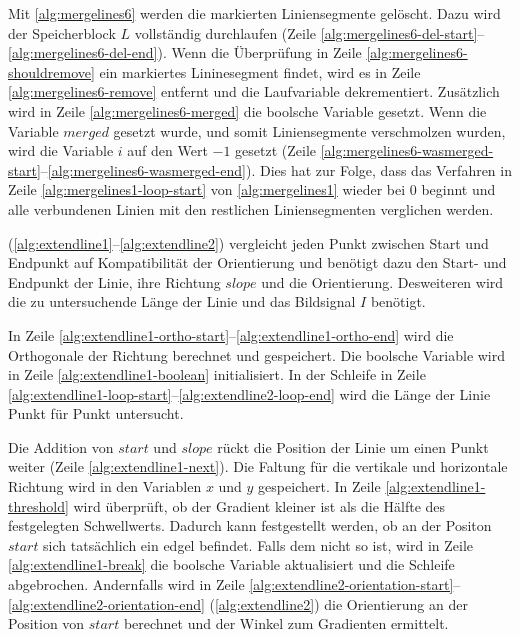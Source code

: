 Mit \autoref{alg:mergelines6} werden die markierten Liniensegmente gelöscht. Dazu wird der Speicherblock $L$
 vollständig durchlaufen (Zeile \ref{alg:mergelines6-del-start}--\ref{alg:mergelines6-del-end}). Wenn die Überprüfung
 in Zeile \ref{alg:mergelines6-shouldremove} ein markiertes Lininesegment findet, wird es in Zeile
 \ref{alg:mergelines6-remove} entfernt und die Laufvariable dekrementiert. Zusätzlich wird in Zeile
 \ref{alg:mergelines6-merged} die boolsche Variable gesetzt. Wenn die Variable $\mathit{merged}$ gesetzt wurde, und
 somit Liniensegmente verschmolzen wurden, wird die Variable $i$ auf den Wert $-1$ gesetzt
 (Zeile \ref{alg:mergelines6-wasmerged-start}--\ref{alg:mergelines6-wasmerged-end}). Dies hat zur Folge, dass das
 Verfahren  in Zeile \ref{alg:mergelines1-loop-start} von \autoref{alg:mergelines1} wieder bei $0$
 beginnt und alle verbundenen Linien mit den restlichen Liniensegmenten verglichen werden.



 (\autoref{alg:extendline1}--\autoref{alg:extendline2}) vergleicht jeden Punkt zwischen Start und
 Endpunkt auf Kompatibilität der Orientierung und benötigt dazu den Start- und Endpunkt der Linie, ihre Richtung
 $\mathit{slope}$ und die Orientierung. Desweiteren wird die zu untersuchende Länge der Linie und das Bildsignal $I$
 benötigt.



In Zeile \ref{alg:extendline1-ortho-start}--\ref{alg:extendline1-ortho-end} wird die Orthogonale der Richtung berechnet
 und gespeichert. Die boolsche Variable wird in Zeile \ref{alg:extendline1-boolean} initialisiert. In der Schleife in
 Zeile \ref{alg:extendline1-loop-start}--\ref{alg:extendline2-loop-end} wird die Länge der Linie Punkt für Punkt
 untersucht.

Die Addition von $\mathit{start}$ und $\mathit{slope}$ rückt die Position der Linie um einen Punkt weiter (Zeile
 \ref{alg:extendline1-next}). Die Faltung für die vertikale und horizontale Richtung wird in den Variablen $x$ und $y$
 gespeichert. In Zeile \ref{alg:extendline1-threshold} wird überprüft, ob der Gradient kleiner ist als die Hälfte des
 festgelegten Schwellwerts. Dadurch kann festgestellt werden, ob an der Positon $\mathit{start}$ sich tatsächlich ein
 \gls{edgel} befindet. Falls dem nicht so ist, wird in Zeile \ref{alg:extendline1-break} die boolsche Variable
 aktualisiert und die Schleife abgebrochen. Andernfalls wird in Zeile
 \ref{alg:extendline2-orientation-start}--\ref{alg:extendline2-orientation-end} (\autoref{alg:extendline2}) die
 Orientierung an der Position von $\mathit{start}$ berechnet und der Winkel zum Gradienten ermittelt.

